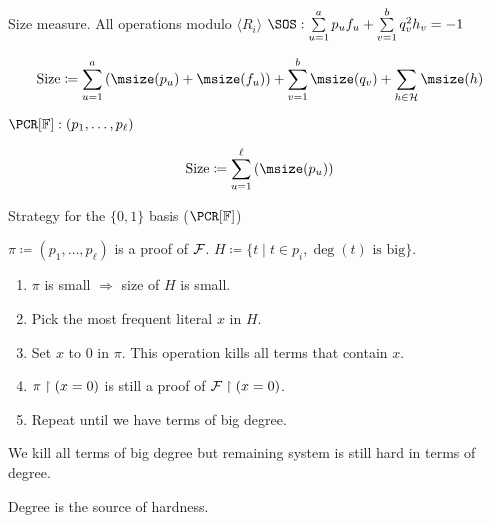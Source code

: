 \begin{frame}{Size measure. All operations modulo $\langle R_i \rangle$}
    \pause
    $\SOS: \sum\limits_{u = 1}^{a} p_u f_u + \sum\limits_{v = 1}^{b} q_v^2 h_v = -1$

    $$
    \text{Size} \coloneqq \sum_{u = 1}^{a} \left( \msize(p_u) + \msize(f_u) \right) +
    \sum_{v = 1}^{b} \msize(q_v) + \sum_{h \in \Hs} \msize(h)
    $$
        
    \vspace{1cm}
    $\PCR[\field]: (p_1, \dots, p_{\ell})$
    
    $$
    \text{Size} \coloneqq \sum_{u = 1}^{\ell} \left( \msize(p_u) \right)
    $$
\end{frame}


\begin{frame}{Strategy for the $\{0, 1\}$ basis ($\PCR[\field]$)}
    
    $\pi \coloneqq (p_1, \dots, p_{\ell})$ is a proof of $\mathcal{F}$. $H \coloneqq \{t \mid t \in p_i, \deg(t)
    \text{ is big}\}$.

    \begin{enumerate}
        \item $\pi$ is small $\Rightarrow$ size of $H$ is small.
        \pause
        \item Pick the most frequent literal $x$ in $H$.
        \pause
        \item Set $x$ to $0$ in $\pi$. This operation kills all terms that contain $x$.
        \pause
        \item $\pi \upharpoonright (x = 0)$ is still a proof of $\mathcal{F} \upharpoonright (x = 0)$.
        \pause
        \pause
        \pause    
        \item Repeat until we have terms of big degree.
    \end{enumerate}

    \vspace{0.3cm}
    \pause
    We kill all terms of big degree but remaining system is still hard in terms of degree.

    \vspace{0.3cm}
    \pause
    \begin{center}
        \Huge Degree is the source of hardness.
    \end{center}
\end{frame}


